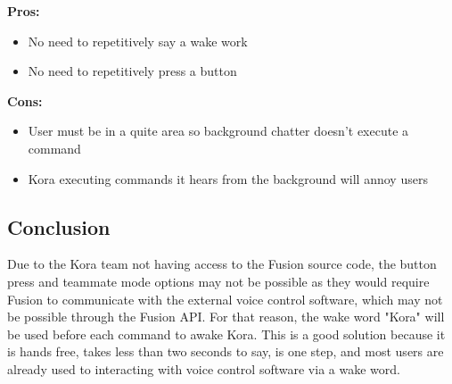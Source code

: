 \documentclass[onecolumn, draftclsnofoot,10pt, compsoc]{IEEEtran}
\begin{document}
			\textbf{Pros:}
				\begin{itemize}
					\item{
						No need to repetitively say a wake work}
					\item{
						No need to repetitively press a button}
				\end{itemize}
			
			\textbf{Cons:}
				\begin{itemize}
					\item{
						User must be in a quite area so background chatter doesn't execute a command}
					\item{
						Kora executing commands it hears from the background will annoy users}
				\end{itemize}
			
			
		\subsection{Conclusion}
			Due to the Kora team not having access to the Fusion source code, the button press and teammate mode options may not be possible as they would require Fusion to communicate with the external voice control software, which may not be possible through the Fusion API.
			For that reason, the wake word "Kora" will be used before each command to awake Kora.
			This is a good solution because it is hands free, takes less than two seconds to say, is one step, and most users are already used to interacting with voice control software via a wake word.
		
		
	
	
\end{document}
